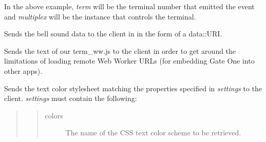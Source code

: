 \documentclass[letterpaper,10pt,openany]{sphinxmanual}
\begin{document}
\begin{fulllineitems}
\begin{fulllineitems}
In the above example, \emph{term} will be the terminal number that emitted
the event and \emph{multiplex} will be the  instance that
controls the terminal.

\end{fulllineitems}


\begin{fulllineitems}
\label{Applications/terminal/app_terminal:app_terminal.TerminalApplication.get_bell}
Sends the bell sound data to the client in in the form of a data::URI.

\end{fulllineitems}


\begin{fulllineitems}
\label{Applications/terminal/app_terminal:app_terminal.TerminalApplication.get_webworker}
Sends the text of our term\_ww.js to the client in order to get
around the limitations of loading remote Web Worker URLs (for embedding
Gate One into other apps).

\end{fulllineitems}


\begin{fulllineitems}
\label{Applications/terminal/app_terminal:app_terminal.TerminalApplication.get_colors}
Sends the text color stylesheet matching the properties specified in
\emph{settings} to the client.  \emph{settings} must contain the following:
\begin{quote}
\begin{quote}\begin{description}
\item[{colors}] \leavevmode
The name of the CSS text color scheme to be retrieved.

\end{description}\end{quote}
\end{quote}

\end{fulllineitems}



\end{fulllineitems}
\end{document}
